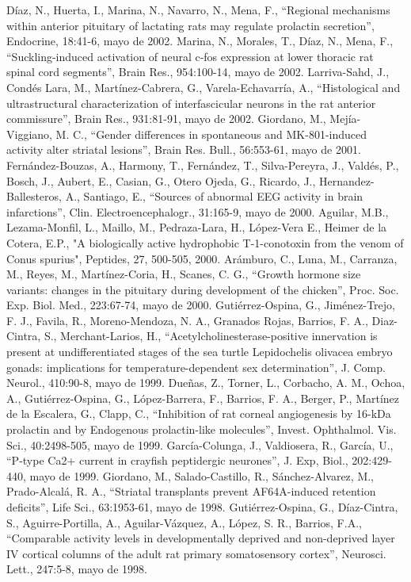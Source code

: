Díaz, N., Huerta, I., Marina, N., Navarro, N., Mena, F., “Regional mechanisms within anterior pituitary of lactating rats may regulate prolactin secretion”, 
Endocrine, 18:41-6,  mayo de 2002.
Marina, N., Morales, T., Díaz, N., Mena, F., “Suckling-induced activation of neural c-fos expression at lower thoracic rat spinal cord segments”, Brain 
Res., 954:100-14,  mayo de 2002.
Larriva-Sahd, J., Condés Lara, M., Martínez-Cabrera, G., Varela-Echavarría, A., “Histological and ultrastructural characterization of interfascicular 
neurons in the rat anterior commissure”, Brain Res., 931:81-91,  mayo de 2002. 
Giordano, M., Mejía-Viggiano, M. C., “Gender differences in spontaneous and MK-801-induced activity alter striatal lesions”, Brain Res. Bull., 56:553-61,  
mayo de 2001.
Fernández-Bouzas, A., Harmony, T., Fernández, T., Silva-Pereyra, J., Valdés, P., Bosch, J., Aubert, E., Casian, G., Otero Ojeda, G., Ricardo, J., 
Hernandez-Ballesteros, A., Santiago, E., “Sources of abnormal EEG activity in brain infarctions”, Clin. Electroencephalogr., 31:165-9,  mayo de 2000.
Aguilar, M.B., Lezama-Monfil, L., Maillo, M., Pedraza-Lara, H., López-Vera E., Heimer de la Cotera, E.P., "A biologically active hydrophobic T-1-conotoxin 
from the venom of Conus spurius", Peptides, 27, 500-505,  2000.
Arámburo, C., Luna, M., Carranza, M., Reyes, M., Martínez-Coria, H., Scanes, C. G., “Growth hormone size variants: changes in the pituitary during 
development of the chicken”, Proc. Soc. Exp. Biol. Med., 223:67-74,  mayo de 2000.
Gutiérrez-Ospina, G., Jiménez-Trejo, F. J., Favila, R., Moreno-Mendoza, N. A., Granados Rojas, Barrios, F. A., Diaz-Cintra, S., Merchant-Larios, H., 
“Acetylcholinesterase-positive innervation is present at undifferentiated stages of the sea turtle Lepidochelis olivacea embryo gonads: implications for 
temperature-dependent sex determination”, J. Comp. Neurol., 410:90-8,  mayo de 1999.
Dueñas, Z., Torner, L., Corbacho, A. M., Ochoa, A., Gutiérrez-Ospina, G., López-Barrera, F., Barrios, F. A., Berger, P., Martínez de la Escalera, G., Clapp, 
C., “Inhibition of rat corneal angiogenesis by 16-kDa prolactin and by Endogenous prolactin-like molecules”, Invest. Ophthalmol. Vis. Sci., 40:2498-505,  
mayo de 1999.
García-Colunga, J., Valdiosera, R., García, U., “P-type Ca2+ current in crayfish peptidergic neurones”, J. Exp, Biol., 202:429-440,  mayo de 1999.
Giordano, M., Salado-Castillo, R., Sánchez-Alvarez, M., Prado-Alcalá, R. A., “Striatal transplants prevent AF64A-induced retention deficits”, Life Sci., 
63:1953-61,  mayo de 1998.
Gutiérrez-Ospina, G., Díaz-Cintra, S., Aguirre-Portilla, A., Aguilar-Vázquez, A., López, S. R., Barrios, F.A., “Comparable activity levels in 
developmentally deprived and non-deprived layer IV cortical columns of the adult rat primary somatosensory cortex”, Neurosci. Lett., 247:5-8,  mayo de 1998.


